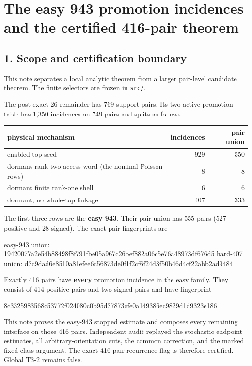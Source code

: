 \section{The easy 943 promotion incidences and the certified 416-pair
theorem}

\subsection{1. Scope and certification
boundary}

This note separates a local analytic theorem from a larger pair-level
candidate theorem. The finite selectors are frozen in
\texttt{src/\texttt{}}.

The post-exact-26 remainder has 769 support pairs. Its two-active
promotion table has 1,350 incidences on 749 pairs and splits as follows.

{\small{} %
\begin{longtable}[]{@{}lrr@{}}
\toprule\noalign{}
physical mechanism & incidences & pair union \\
\midrule\noalign{}
\endhead
\bottomrule\noalign{}
\endlastfoot
enabled top seed & 929 & 550 \\
dormant rank-two access word (the nominal Poisson rows) & 8 & 8 \\
dormant finite rank-one shell & 6 & 6 \\
dormant, no whole-top linkage & 407 & 333 \\
\end{longtable}
}

The first three rows are the \textbf{easy 943}. Their pair union has 555
pairs (527 positive and 28 signed). The exact pair fingerprints are

\begin{CodeBlock}
easy-943 union: 19420077a2e54b88498f8f791fbe05a967c26bef882a06c5e76a48973df676d5
hard-407 union: d3c9dad6e8510a81efee6c56873de0f1f2cf6f24d3f50b46d4cf22abb2ad9484
\end{CodeBlock}

Exactly 416 pairs have \textbf{every} promotion incidence in the easy
family. They consist of 414 positive pairs and two signed pairs and have
fingerprint

\begin{CodeBlock}
8c3325983568c53772f024080c0b95d37873cfe0a149386ec9829d1d9323e186
\end{CodeBlock}

This note proves the easy-943 stopped estimate and composes every
remaining interface on those 416 pairs. Independent audit replayed the
stochastic endpoint estimates, all arbitrary-orientation cuts, the
common correction, and the marked fixed-class argument. The exact
416-pair recurrence flag is therefore certified. Global T3-2 remains
false.

